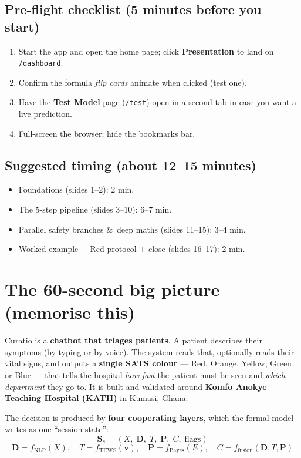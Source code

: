 \documentclass[11pt]{article}
\newcommand{\route}[1]{{\small\texttt{\textcolor{mutel}{#1}}}}
\begin{document}
\subsection*{Pre-flight checklist (5 minutes before you start)}
\begin{enumerate}
  \item Start the app and open the home page; click \textbf{Presentation} to land on \route{/dashboard}.
  \item Confirm the formula \emph{flip cards} animate when clicked (test one).
  \item Have the \textbf{Test Model} page (\route{/test}) open in a second tab in case you want a live prediction.
  \item Full-screen the browser; hide the bookmarks bar.
\end{enumerate}

\subsection*{Suggested timing (about 12--15 minutes)}
\begin{itemize}
  \item Foundations (slides 1--2): 2 min.
  \item The 5-step pipeline (slides 3--10): 6--7 min.
  \item Parallel safety branches \&\ deep maths (slides 11--15): 3--4 min.
  \item Worked example + Red protocol + close (slides 16--17): 2 min.
\end{itemize}

\section{The 60-second big picture (memorise this)}

\begin{idea}
Curatio is a \textbf{chatbot that triages patients}. A patient describes their symptoms (by typing or
by voice). The system reads that, optionally reads their vital signs, and outputs a \textbf{single SATS
colour} --- Red, Orange, Yellow, Green or Blue --- that tells the hospital \emph{how fast} the patient
must be seen and \emph{which department} they go to. It is built and validated around
\textbf{Komfo Anokye Teaching Hospital (KATH)} in Kumasi, Ghana.
\end{idea}

\noindent The decision is produced by \textbf{four cooperating layers}, which the formal model writes as one
``session state'':
\[
\mathbf{S}_s = (X,\; \mathbf{D},\; T,\; \mathbf{P},\; C,\; \text{flags})
\]
\[
\mathbf{D} = f_{\mathrm{NLP}}(X),\quad
T = f_{\mathrm{TEWS}}(\mathbf{v}),\quad
\mathbf{P} = f_{\mathrm{Bayes}}(E),\quad
C = f_{\mathrm{fusion}}(\mathbf{D}, T, \mathbf{P})
\]
\end{document}

